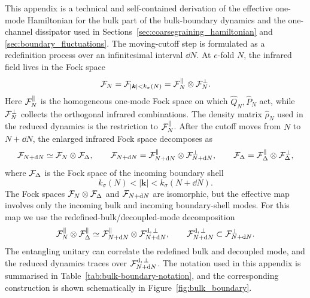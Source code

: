 \documentclass{article}
\def\cF{{\cal F}}
\numberwithin{equation}{section}
\begin{document}
	This appendix is a technical and self-contained derivation of the effective one-mode Hamiltonian for the bulk part of the bulk-boundary dynamics and the one-channel dissipator used in Sections~\ref{sec:coarsegraining_hamiltonian} and \ref{sec:boundary_fluctuations}. The moving-cutoff step is formulated as a redefinition process over an infinitesimal interval \(\dd N\). At $e$-fold \(N\), the infrared field lives in the Fock space
	\begin{equation}
		\cF_N = \cF_{|\bm k|<k_\sigma(N)}
		=\cF_N^\parallel\otimes\cF_N^\perp .
	\end{equation}
	Here \(\cF_N^\parallel\) is the homogeneous one-mode Fock space on which \(\hat Q_N,\hat P_N\) act, while \(\cF_N^\perp\) collects the orthogonal infrared combinations. The density matrix \(\hat\rho_N\) used in the reduced dynamics is the restriction to \(\cF_N^\parallel\). After the cutoff moves from \(N\) to \(N+\dd N\), the enlarged infrared Fock space decomposes as
	\begin{equation}
		\cF_{N+\dd N} \simeq \cF_N\otimes\cF_\Delta,\qquad
		\cF_{N+\dd N}=\cF_{N+\dd N}^\parallel\otimes\cF_{N+\dd N}^\perp,\qquad
		\cF_\Delta=\cF_\Delta^\parallel\otimes\cF_\Delta^\perp ,
	\end{equation}
	where \(\cF_\Delta\) is the Fock space of the incoming boundary shell
	\begin{equation}
		k_\sigma(N)<|\bm k|<k_\sigma(N+\dd N).
	\end{equation}
	The Fock spaces \(\cF_N\otimes\cF_\Delta\) and \(\cF_{N+\dd N}\) are isomorphic, but the effective map involves only the incoming bulk and incoming boundary-shell modes. For this map we use the redefined-bulk/decoupled-mode decomposition
	\begin{equation}
		\cF_N^\parallel\otimes\cF_\Delta^\parallel
		\simeq \cF_{N+\dd N}^\parallel\otimes\cF^{\rm d,\,\perp}_{N+\dd N},
		\qquad \cF^{\rm d,\,\perp}_{N+\dd N}\subset\cF_{N+\dd N}^\perp .
		\label{eq:ParallelOutputDecompositionApp}
	\end{equation}
	The entangling unitary can correlate the redefined bulk and decoupled mode, and the reduced dynamics traces over \(\cF^{\rm d,\,\perp}_{N+\dd N}\). The notation used in this appendix is summarised in Table~\ref{tab:bulk-boundary-notation}, and the corresponding construction is shown schematically in Figure~\ref{fig:bulk_boundary}.
\end{document}
